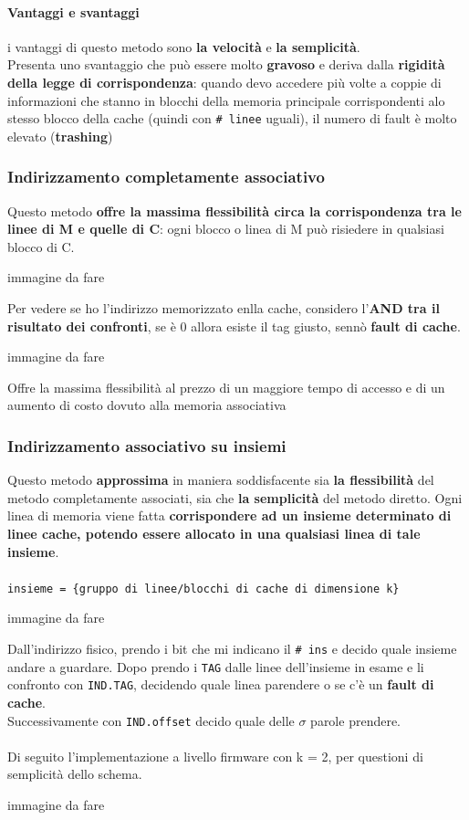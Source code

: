 \documentclass[10pt]{report}
\begin{document}
\paragraph{Vantaggi e svantaggi} i vantaggi di questo metodo sono \textbf{la velocità} e \textbf{la semplicità}.\\
Presenta uno svantaggio che può essere molto \textbf{gravoso} e deriva dalla \textbf{rigidità della legge di corrispondenza}: quando devo accedere più volte a coppie di informazioni che stanno in blocchi della memoria principale corrispondenti alo stesso blocco della cache (quindi con \texttt{\# linee} uguali), il numero di fault è molto elevato (\textbf{trashing})
\subsubsection{Indirizzamento completamente associativo}
Questo metodo \textbf{offre la massima flessibilità circa la corrispondenza tra le linee di M e quelle di C}: ogni blocco o linea di M può risiedere in qualsiasi blocco di C.
\begin{multicols}{2}
\begin{center}
immagine da fare
\end{center}
\columnbreak
Per vedere se ho l'indirizzo memorizzato enlla cache, considero l'\textbf{AND tra il risultato dei confronti}, se è 0 allora esiste il tag giusto, sennò \textbf{fault di cache}.
\end{multicols}
\begin{center}
immagine da fare
\end{center}
Offre la massima flessibilità al prezzo di un maggiore tempo di accesso e di un aumento di costo dovuto alla memoria associativa
\subsubsection{Indirizzamento associativo su insiemi}
Questo metodo \textbf{approssima} in maniera soddisfacente sia \textbf{la flessibilità} del metodo completamente associati, sia che \textbf{la semplicità} del metodo diretto. Ogni linea di memoria viene fatta \textbf{corrispondere ad un insieme determinato di linee cache, potendo essere allocato in una qualsiasi linea di tale insieme}.\\\\
\texttt{insieme = \{gruppo di linee/blocchi di cache di dimensione k\}}
\begin{center}
immagine da fare
\end{center}
Dall'indirizzo fisico, prendo i bit che mi indicano il \texttt{\# ins} e decido quale insieme andare a guardare. Dopo prendo i \texttt{TAG} dalle linee dell'insieme in esame e li confronto con \texttt{IND.TAG}, decidendo quale linea parendere o se c'è un \textbf{fault di cache}.\\
Successivamente con \texttt{IND.offset} decido quale delle $\sigma$ parole prendere.\\\\
Di seguito l'implementazione a livello firmware con k = 2, per questioni di semplicità dello schema.
\begin{center}
immagine da fare
\end{center}
\end{document}
